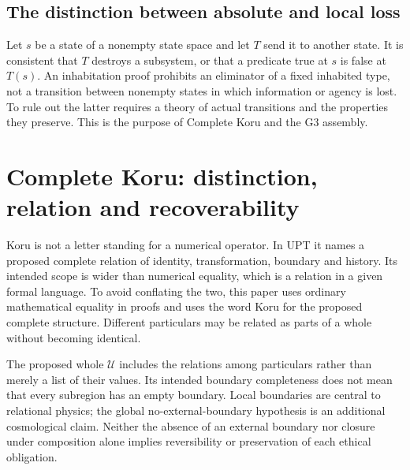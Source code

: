 \documentclass[11pt,a4paper]{article}
\begin{document}
\subsection{The distinction between absolute and local loss}
Let $s$ be a state of a nonempty state space and let $T$ send it to another state. It is consistent that $T$ destroys a subsystem, or that a predicate true at $s$ is false at $T(s)$. An inhabitation proof prohibits an eliminator of a fixed inhabited type, not a transition between nonempty states in which information or agency is lost. To rule out the latter requires a theory of actual transitions and the properties they preserve. This is the purpose of Complete Koru and the G3 assembly.
\section{Complete Koru: distinction, relation and recoverability}
Koru is not a letter standing for a numerical operator. In UPT it names a proposed complete relation of identity, transformation, boundary and history. Its intended scope is wider than numerical equality, which is a relation in a given formal language. To avoid conflating the two, this paper uses ordinary mathematical equality in proofs and uses the word Koru for the proposed complete structure. Different particulars may be related as parts of a whole without becoming identical.

The proposed whole $\mathcal U$ includes the relations among particulars rather than merely a list of their values. Its intended boundary completeness does not mean that every subregion has an empty boundary. Local boundaries are central to relational physics; the global no-external-boundary hypothesis is an additional cosmological claim. Neither the absence of an external boundary nor closure under composition alone implies reversibility or preservation of each ethical obligation.
\end{document}
